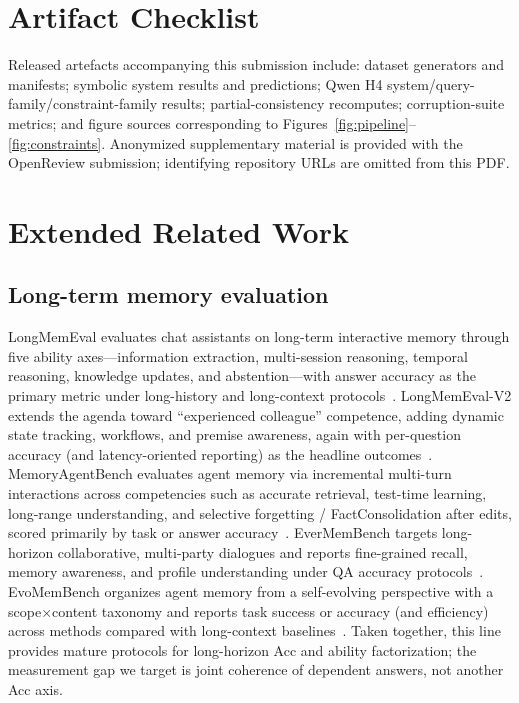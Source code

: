 \section{Artifact Checklist}
\label{app:artifacts}

Released artefacts accompanying this submission include: dataset generators and manifests; symbolic system results and predictions; Qwen H4 system/query-family/constraint-family results; partial-consistency recomputes; corruption-suite metrics; and figure sources corresponding to Figures~\ref{fig:pipeline}--\ref{fig:constraints}. Anonymized supplementary material is provided with the OpenReview submission; identifying repository URLs are omitted from this PDF.

\section{Extended Related Work}
\label{app:related}
\label{app:closest}

\subsection{Long-term memory evaluation}

LongMemEval evaluates chat assistants on long-term interactive memory through five ability axes---information extraction, multi-session reasoning, temporal reasoning, knowledge updates, and abstention---with answer accuracy as the primary metric under long-history and long-context protocols~\citep{wu2025longMemEval}. LongMemEval-V2 extends the agenda toward ``experienced colleague'' competence, adding dynamic state tracking, workflows, and premise awareness, again with per-question accuracy (and latency-oriented reporting) as the headline outcomes~\citep{wu2026longMemEvalV2}. MemoryAgentBench evaluates agent memory via incremental multi-turn interactions across competencies such as accurate retrieval, test-time learning, long-range understanding, and selective forgetting / FactConsolidation after edits, scored primarily by task or answer accuracy~\citep{hu2025memoryAgentBench}. EverMemBench targets long-horizon collaborative, multi-party dialogues and reports fine-grained recall, memory awareness, and profile understanding under QA accuracy protocols~\citep{hu2026everMemBench}. EvoMemBench organizes agent memory from a self-evolving perspective with a scope$\times$content taxonomy and reports task success or accuracy (and efficiency) across methods compared with long-context baselines~\citep{wang2026evoMemBench}. Taken together, this line provides mature protocols for long-horizon Acc and ability factorization; the measurement gap we target is joint coherence of dependent answers, not another Acc axis.

